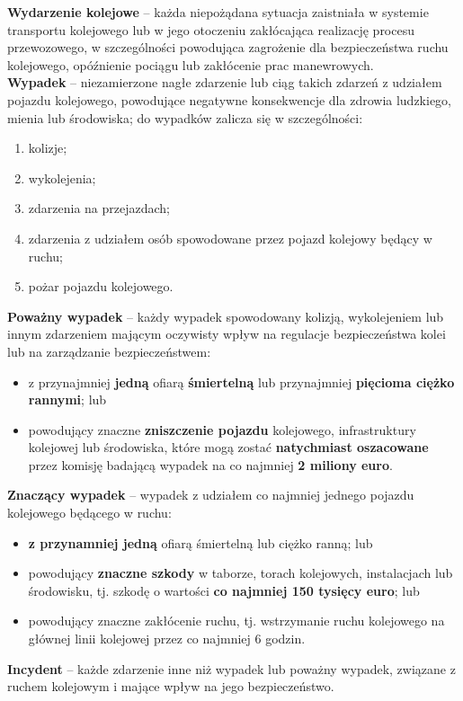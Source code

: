 \textbf{Wydarzenie kolejowe} – każda niepożądana sytuacja zaistniała w systemie transportu kolejowego lub w jego otoczeniu zakłócająca realizację procesu przewozowego, w szczególności powodująca zagrożenie dla bezpieczeństwa ruchu kolejowego, opóźnienie pociągu lub zakłócenie prac manewrowych.
\\
\textbf{Wypadek} – niezamierzone nagłe zdarzenie lub ciąg takich zdarzeń z udziałem pojazdu kolejowego, powodujące negatywne konsekwencje dla zdrowia ludzkiego, mienia lub środowiska; 
do wypadków zalicza się w szczególności:
\begin{enumerate}
	\item kolizje;
	\item wykolejenia;
	\item zdarzenia na przejazdach;
	\item zdarzenia z udziałem osób spowodowane przez pojazd kolejowy będący w ruchu;
	\item pożar pojazdu kolejowego.
\end{enumerate}
\textbf{Poważny wypadek} – każdy wypadek spowodowany kolizją, wykolejeniem lub innym
zdarzeniem mającym oczywisty wpływ na regulacje bezpieczeństwa kolei lub na
zarządzanie bezpieczeństwem:
\begin{itemize}
	\item z przynajmniej \textbf{jedną} ofiarą \textbf{śmiertelną} lub przynajmniej \textbf{pięcioma ciężko rannymi};
	lub
	\item powodujący znaczne \textbf{zniszczenie pojazdu} kolejowego, infrastruktury kolejowej lub środowiska, które mogą zostać \textbf{natychmiast oszacowane} przez komisję badającą wypadek na co najmniej \textbf{2 miliony euro}.
\end{itemize}
\textbf{Znaczący wypadek} – wypadek z udziałem co najmniej jednego pojazdu kolejowego
będącego w ruchu:
\begin{itemize}
\item \textbf{z przynamniej jedną} ofiarą śmiertelną lub ciężko ranną;
lub
\item powodujący \textbf{znaczne szkody} w taborze, torach kolejowych, instalacjach lub
środowisku, tj. szkodę o wartości \textbf{co najmniej 150 tysięcy euro};
lub
\item powodujący znaczne zakłócenie ruchu, tj. wstrzymanie ruchu kolejowego na głównej linii kolejowej przez co najmniej 6 godzin.
\end{itemize}

\textbf{Incydent} – każde zdarzenie inne niż wypadek lub poważny wypadek, związane z ruchem kolejowym i mające wpływ na jego bezpieczeństwo.

